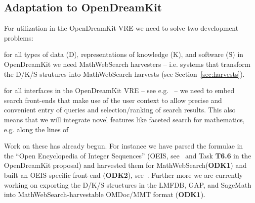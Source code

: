 \documentclass{deliverablereport}
\def\pn{OpenDreamKit\xspace}
\def\MWS{\textsf{MathWebSearch}\xspace}
\begin{document}
\subsection*{Adaptation to \pn} For utilization in the \pn VRE we need to solve two
development problems: 
\begin{compactenum}[\bf ODK1]
\item for all types of data (D), representations of knowledge (K), and software (S) in \pn
  we need \MWS harvesters -- i.e. systems that transform the D/K/S strutures into \MWS
  harvests (see Section~\ref{sec:harvests}).
\item for all interfaces in the \pn VRE -- see e.g.~\cite{ODK-D4.2} -- we need to embed
  search front-ends that make use of the user context to allow precise and convenient
  entry of queries and selection/ranking of search results. This also means that we will
  integrate novel features like faceted search for mathematics, e.g. along the lines
  of~\cite{HamKoh:fsm15}
\end{compactenum}
Work on these has already begun. For instance we have parsed the formulae in the ``Open
Encyclopedia of Integer Sequences'' (OEIS, see~\cite{oeis} and Task \textbf{T6.6} in the
\pn proposal) and harvested them for \MWS (\textbf{ODK1}) and built an OEIS-specific
front-end (\textbf{ODK2}), see~\cite{LuzKoh:fsarfo16}. Further more we are currently
working on exporting the D/K/S structures in the LMFDB, GAP, and SageMath into
\MWS-harvestable OMDoc/MMT format (\textbf{ODK1}). 

\newpage\printbibliography
\end{document}
